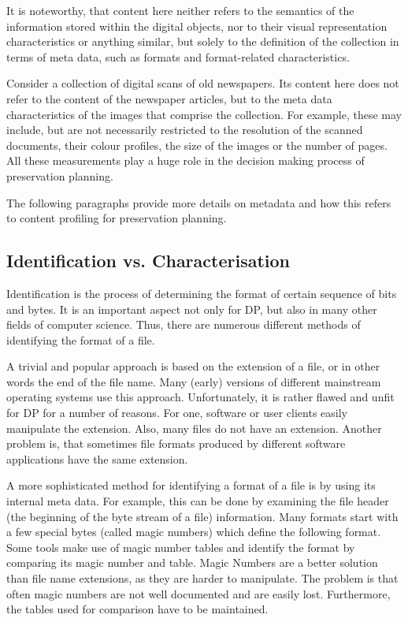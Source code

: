 It is noteworthy, that content here neither refers to the semantics of the information stored within the digital objects, nor to their visual representation characteristics or anything similar, but solely to the definition of the collection in terms of meta data, such as formats and format-related characteristics.

Consider a collection of digital scans of old newspapers. Its content here does not refer to the content of the newspaper articles, but to the meta data characteristics of the images that comprise the collection. For example, these may include, but are not necessarily restricted to the resolution of the scanned documents, their colour profiles, the size of the images or the number of pages. All these measurements play a huge role in the decision making process of preservation planning.

The following paragraphs provide more details on metadata and how this refers to content profiling for preservation planning.

\subsection{Identification vs. Characterisation}
Identification is the process of determining the format of certain sequence of bits and bytes. It is an important aspect not only for DP, but also in many other fields of computer science. Thus, there are numerous different methods of identifying the format of a file.

A trivial and popular approach is based on the extension of a file, or in other words the end of the file name. Many (early) versions of different mainstream operating systems use this approach. Unfortunately, it is rather flawed and unfit for DP for a number of reasons. For one, software or user clients easily manipulate the extension. Also, many files do not have an extension. Another problem is, that sometimes file formats produced by different software applications have the same extension.

A more sophisticated method for identifying a format of a file is by using its internal meta data. For example, this can be done by examining the file header (the beginning of the byte stream of a file) information. Many formats start with a few special bytes (called magic numbers) which define the following format. Some tools make use of magic number tables and identify the format by comparing its magic number and table. Magic Numbers are a better solution than file name extensions, as they are harder to manipulate. The problem is that often magic numbers are not well documented and are easily lost. Furthermore, the tables used for comparison have to be maintained.

